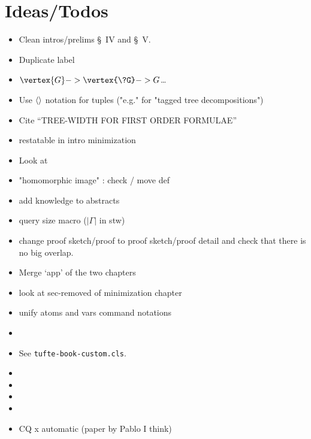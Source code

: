 \chapter*{Ideas/Todos}


\begin{itemize}
	\item Clean intros/prelims \S~IV and \S~V.
	\item Duplicate label
	\item $\vertex{G} -> \vertex{\?G} -> G$…
	\item Use $\langle\rangle$ notation for tuples ("e.g." for "tagged tree decompositions")
	\item Cite ``TREE-WIDTH FOR FIRST ORDER FORMULAE''
	\item restatable in intro minimization
	\item Look at \cite{ChenGottlobLanzingerPichler2020Semantic}
	\item "homomorphic image" : check / move def
	\item add knowledge to abstracts
	\item query size macro ($|\Gamma|$ in stw)
	\item change proof sketch/proof to proof sketch/proof detail and check
		that there is no big overlap.
	\item Merge `app' of the two chapters
	\item look at sec-removed of minimization chapter
	\item unify atoms and vars command notations
	\item {}
	\item {}
		See \texttt{tufte-book-custom.cls}.
	\item {}
	\item {}
	\item {}
	\item {}
	\item CQ x automatic (paper by Pablo I think)
\end{itemize}

